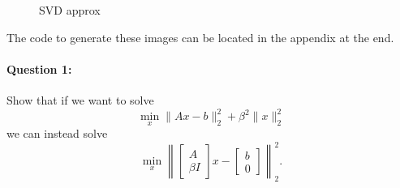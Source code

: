 \documentclass[11pt,onecolumn]{article}
\newcommand{\bluebox}[1]{
  \begin{tcolorbox}[colback=blue!5!white,colframe=blue!75!black,boxrule=0.5pt,boxsep=0pt,left=6pt,right=16pt,top=4pt,bottom=4pt]
  #1
  \end{tcolorbox}   
}
\begin{document}
\begin{figure}[H]
\begin{minipage}{0.45\textwidth}
    \caption{SVD approx}
  \end{minipage}
\end{figure}

The code to generate these images can be located in the appendix at the end.

\newpage
\bluebox{
\paragraph{Question 1:}
Show that if we want to solve $$\min_x \|Ax-b\|_2^2 + \beta^2 \|x\|_2^2$$ we can instead solve 
\[
\min_x \left\|\begin{bmatrix}A \\ \beta I\end{bmatrix}x-\begin{bmatrix}b \\ 0\end{bmatrix}\right\|_2^2.
\]}
\end{document}
